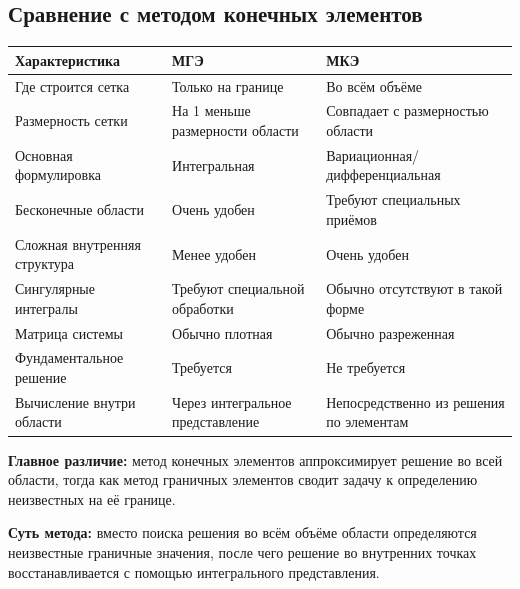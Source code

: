 \subsection{Сравнение с методом конечных элементов}

\begin{center}
	\begin{tabular}{|p{}|p{}|p{}|}
		\hline
		\textbf{Характеристика} & \textbf{МГЭ} & \textbf{МКЭ} \\
		\hline
		Где строится сетка & Только на границе & Во всём объёме \\
		\hline
		Размерность сетки & На 1 меньше размерности области & Совпадает с размерностью области \\
		\hline
		Основная формулировка & Интегральная & Вариационная/дифференциальная \\
		\hline
		Бесконечные области & Очень удобен & Требуют специальных приёмов \\
		\hline
		Сложная внутренняя структура & Менее удобен & Очень удобен \\
		\hline
		Сингулярные интегралы & Требуют специальной обработки & Обычно отсутствуют в такой форме \\
		\hline
		Матрица системы & Обычно плотная & Обычно разреженная \\
		\hline
		Фундаментальное решение & Требуется & Не требуется \\
		\hline
		Вычисление внутри области & Через интегральное представление & Непосредственно из решения по элементам \\
		\hline
	\end{tabular}
\end{center}

\textbf{Главное различие:} метод конечных элементов аппроксимирует решение во всей области, тогда как метод граничных элементов сводит задачу к определению неизвестных на её границе.

\textbf{Суть метода:} вместо поиска решения во всём объёме области определяются неизвестные граничные значения, после чего решение во внутренних точках восстанавливается с помощью интегрального представления.

\newpage